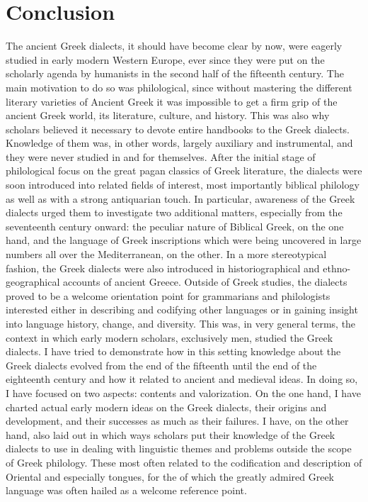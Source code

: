 \chapter{Conclusion} \label{chap:9}

The ancient Greek dialects, it should have become clear by now, were eagerly studied in early modern Western Europe, ever since they were put on the scholarly agenda by humanists in the second half of the fifteenth century. The main motivation to do so was philological, since without mastering the different literary varieties of Ancient Greek it was impossible to get a firm grip of the ancient Greek world, its literature, culture, and history. This was also why scholars believed it necessary to devote entire handbooks to the Greek dialects. Knowledge of them was, in other words, largely auxiliary and instrumental, and they were never studied in and for themselves. After the initial stage of philological focus on the great pagan classics of Greek literature, the dialects were soon introduced into related fields of interest, most importantly biblical philology as well as  with a strong antiquarian touch. In particular, awareness of the Greek dialects urged them to investigate two additional matters, especially from the seventeenth century onward: the peculiar nature of Biblical Greek, on the one hand, and the language of Greek inscriptions which were being uncovered in large numbers all over the Mediterranean, on the other. In a more stereotypical fashion, the Greek dialects were also introduced in historiographical and ethno-geographical accounts of ancient Greece. Outside of Greek studies, the dialects proved to be a welcome orientation point for grammarians and philologists interested either in describing and codifying other languages or in gaining insight into language history, change, and diversity. This was, in very general terms, the context in which early modern scholars, exclusively men, studied the Greek dialects. I have tried to demonstrate how in this setting knowledge about the Greek dialects evolved from the end of the fifteenth until the end of the eighteenth century and how it related to ancient and medieval ideas. In doing so, I have focused on two aspects: contents and valorization. On the one hand, I have charted actual early modern ideas on the Greek dialects, their origins and development, and their successes as much as their failures. I have, on the other hand, also laid out in which ways scholars put their knowledge of the Greek dialects to use in dealing with linguistic themes and problems outside the scope of Greek philology. These most often related to the codification and description of Oriental and especially  tongues, for the  of which the greatly admired Greek language was often hailed as a welcome reference point.

